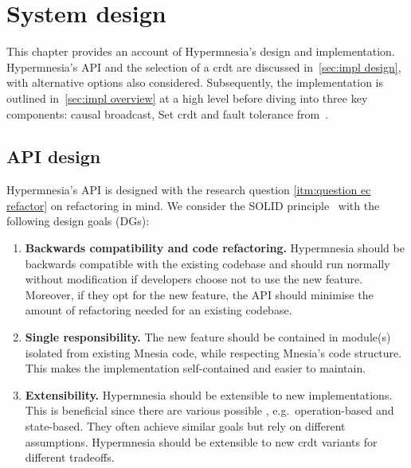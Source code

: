\section{System design} \label{sec:design}

This chapter provides an account of Hypermnesia's design and implementation. 
Hypermnesia's API and the selection of a \acrshort{crdt} are discussed
in~\cref{sec:impl design}, with alternative options also considered.
Subsequently, the implementation is outlined in~\cref{sec:impl overview} at a high 
level before diving into three key components: causal 
broadcast, Set \acrshort{crdt} and fault tolerance 
from~. 



\subsection{API design} \label{subsec:impl api}

Hypermnesia's API is designed with the research question \cref{itm:question ec refactor}
on refactoring in mind. We consider the SOLID principle~\cite{martin2000solid}
with the following design goals (DGs):

\begin{enumerate}[label={DG\arabic*.},ref={DG\arabic*}]
  \item \textbf{Backwards compatibility and code refactoring.} Hypermnesia should be
  backwards compatible with the existing codebase and should run normally without
  modification if developers choose not to use the new feature. Moreover, if they opt
  for the new feature, the API should minimise the amount of refactoring 
  needed for an existing codebase. \label{itm:refactor}
  \item \textbf{Single responsibility.} The new feature should be contained in 
  module(s) isolated from existing Mnesia code, while respecting Mnesia's code structure.
  This makes the implementation self-contained and easier to maintain. \label{itm:single resp}
  \item \textbf{Extensibility.} Hypermnesia should be extensible to new 
  implementations. This is beneficial since there are various possible , 
  e.g.\ operation-based and state-based. They often achieve similar goals but rely 
  on different assumptions. Hypermnesia should be extensible to new \acrshort{crdt} 
  variants for different tradeoffs.
  \label{itm:extensible}
\end{enumerate}


